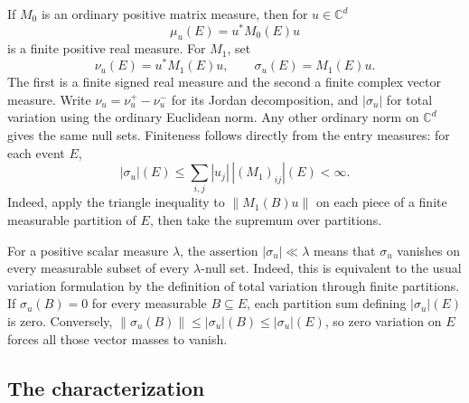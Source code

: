 \documentclass[11pt,oneside]{article}
\theoremstyle{definition}
\theoremstyle{remark}
\newcommand{\C}{\mathbb C}
\begin{document}
If $M_0$ is an ordinary positive matrix measure, then for
$u\in\C^d$
\begin{equation}\label{hnd:eq:scalarnotations}
 \mu_u(E)=u^*M_0(E)u
\end{equation}
is a finite positive real measure. For $M_1$, set
\begin{equation}\label{hnd:eq:tailnotations}
 \nu_u(E)=u^*M_1(E)u,
 \qquad \sigma_u(E)=M_1(E)u.
\end{equation}
The first is a finite signed real measure and the second a finite
complex vector measure. Write $\nu_u=\nu_u^+-\nu_u^-$ for its Jordan
decomposition, and $|\sigma_u|$ for total variation using the ordinary
Euclidean norm. Any other ordinary norm on $\C^d$ gives the same null
sets. Finiteness follows directly from the entry measures: for each event $E$,
\[
 |\sigma_u|(E)\le\sum_{i,j}|u_j|\,|(M_1)_{ij}|(E)<\infty.
\]
Indeed, apply the triangle inequality to $\|M_1(B)u\|$ on each piece of
a finite measurable partition of $E$, then take the supremum over partitions.

For a positive scalar measure $\lambda$, the assertion
$|\sigma_u|\ll\lambda$ means that $\sigma_u$ vanishes on every
measurable subset of every $\lambda$-null set. Indeed, this is equivalent
to the usual variation formulation by the definition of total
variation through finite partitions. If $\sigma_u(B)=0$ for every
measurable $B\subseteq E$, each partition sum defining $|\sigma_u|(E)$
is zero. Conversely,
$\|\sigma_u(B)\|\le|\sigma_u|(B)\le|\sigma_u|(E)$, so zero variation
on $E$ forces all those vector masses to vanish.

\subsection{The characterization}
\end{document}
